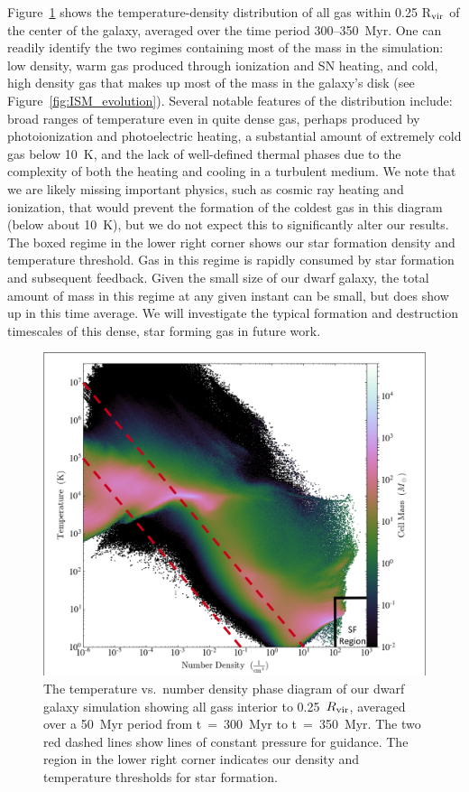 \documentclass[twocolumn]{aastex61}
\begin{document}
Figure~\ref{fig:phase} shows the temperature-density distribution of all gas within 0.25 R$_{\rm vir}$ of the center of the galaxy, averaged over the time period 300--350~Myr. One can readily identify the two regimes containing most of the mass in the simulation: low density, warm gas produced through ionization and SN heating, and cold, high density gas that makes up most of the mass in the galaxy's disk (see Figure~\ref{fig:ISM_evolution}). Several notable features of the distribution include: broad ranges of temperature even in quite dense gas, perhaps produced by photoionization and photoelectric heating, a substantial amount of extremely cold gas below 10~K, and the lack of well-defined thermal phases due to the complexity of both the heating and cooling in a turbulent medium. We note that we are likely missing important physics, such as cosmic ray heating and ionization, that would prevent the formation of the coldest gas in this diagram (below about 10~K), but we do not expect this to significantly alter our results. The boxed regime in the lower right corner shows our star formation density and temperature threshold. Gas in this regime is rapidly consumed by star formation and subsequent feedback. Given the small size of our dwarf galaxy, the total amount of mass in this regime at any given instant can be small, but does show up in this time average. We will investigate the typical formation and destruction timescales of this dense, star forming gas in future work.

\begin{figure}
\centering
\includegraphics[width=0.95\linewidth]{phase_diagram.png}
\caption{The temperature vs.\ number density phase diagram of our dwarf galaxy simulation showing all gass interior to 0.25~$R_{\rm vir}$, averaged over a 50~Myr period from t~=~300~Myr to t~=~350~Myr. The two red dashed lines show lines of constant pressure for guidance. The region in the lower right corner indicates our density and temperature thresholds for star formation.}
\label{fig:phase}
\end{figure} 
\end{document}
